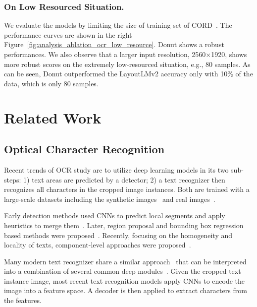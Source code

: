 \documentclass[runningheads]{llncs}
\newcommand\ours{{{\mbox{Donut}}}\xspace}
\begin{document}
\subsubsection{On Low Resourced Situation.}
We evaluate the models by limiting the size of training set of CORD~\cite{park2019cord}. The performance curves are shown in the right Figure~\ref{fig:analysis_ablation_ocr_low_resource}. \ours shows a robust performances. We also observe that a larger input resolution, 2560$\times$1920, shows more robust scores on the extremely low-resourced situation, e.g., 80 samples. As can be seen, \ours outperformed the LayoutLMv2 accuracy only with 10\% of the data, which is only 80 samples.  
\section{Related Work}
\subsection{Optical Character Recognition}
Recent trends of OCR study are to utilize deep learning models in its two sub-steps: 1) text areas are predicted by a detector; 2) a text recognizer then recognizes all characters in the cropped image instances. Both are trained with a large-scale datasets including the synthetic images~\cite{Jaderberg14c,Gupta16} and real images~\cite{7333942,Phan_2013_ICCV}. 

Early detection methods used CNNs to predict local segments and apply heuristics to merge them~\cite{Huang10.1007/978-3-319-10593-2_33,Zhang_2016_CVPR}.
Later, region proposal and bounding box regression based methods were proposed~\cite{LiaoSBWL17}. Recently, focusing on the homogeneity and locality of texts, component-level approaches were proposed~\cite{CTPN,baek2019craft}. 

Many modern text recognizer share a similar approach~\cite{starnet,Shi2016RobustST,Shi2017AnET,jianfeng2017deep} that can be interpreted into a combination of several common deep modules~\cite{baek2019wrong}. Given the cropped text instance image,
most recent text recognition models apply CNNs to encode the image into a feature space. A decoder is then applied to extract characters from the features.
\end{document}
